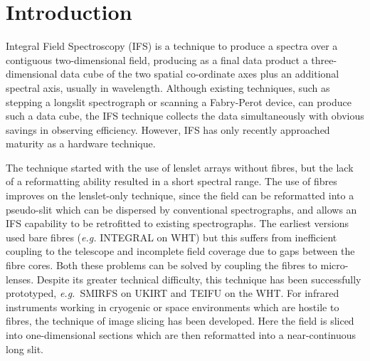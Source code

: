 \documentclass[twoside,11pt]{article}
\newcommand{\stardocinitials}  {SC}
\newcommand{\stardocnumber}    {16.2}
\newcommand{\stardocname}{\stardocinitials /\stardocnumber}
\newenvironment{latexonly}{}{}
\newcommand{\xlabel}[1]{}
\newcommand{\latexonlytoc}[0]{\tableofcontents}
\renewcommand{\thepage}{\roman{page}}
\begin{document}
 \cleardoublepage
 \begin{latexonly}
   \setlength{\parskip}{0mm}
   \latexonlytoc

   \newpage
   \listoffigures

   \setlength{\parskip}{\medskipamount}
   \markright{\stardocname}
 \end{latexonly}

\cleardoublepage
\newpage
\renewcommand{\thepage}{\arabic{page}}
\setcounter{page}{1}


\section{\xlabel{sc16_intro}Introduction\label{sc16_intro}}

Integral Field Spectroscopy (IFS) is a technique to produce a spectra
over a contiguous two-dimensional field, producing as a final data
product a three-dimensional data cube of the two spatial co-ordinate
axes plus an additional spectral axis, usually in wavelength.  Although
existing techniques, such as stepping a longslit spectrograph or
scanning a Fabry-Perot device, can produce such a data cube, the IFS
technique collects the data simultaneously with obvious savings in
observing efficiency.  However, IFS has only recently approached
maturity as a hardware technique.

The technique started with the use of lenslet arrays without fibres,
but the lack of a reformatting ability resulted in a short spectral
range.  The use of fibres improves on the lenslet-only technique, since
the field can be reformatted into a pseudo-slit which can be
dispersed by conventional spectrographs, and allows an IFS capability
to be retrofitted to existing spectrographs.  The earliest versions
used bare fibres (\emph{e.g.} INTEGRAL on WHT) but this suffers from
inefficient coupling to the telescope and incomplete field coverage
due to gaps between the fibre cores.  Both these problems can be solved
by coupling the fibres to micro-lenses.  Despite its greater technical
difficulty, this technique has been successfully prototyped, \emph{e.g.}\
SMIRFS on UKIRT and TEIFU on the WHT.  For infrared instruments working
in cryogenic or space environments which are hostile to fibres, the
technique of image slicing has been developed.  Here the field is
sliced into one-dimensional sections which are then reformatted into a
near-continuous long slit.
\end{document}
